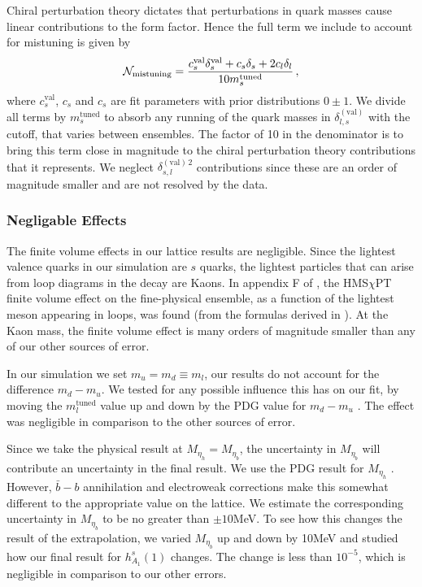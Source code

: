 Chiral perturbation theory dictates that perturbations in quark masses cause linear contributions to the form factor. Hence the full term we include to account for mistuning is given by
\begin{align}
  \mathcal{N}_{\text{mistuning}} = {c^{\text{val}}_s \delta^{\text{val}}_s + c_s \delta_s + 2 c_l \delta_l \over 10 m_s^{\text{tuned}}}\,,
  \label{eq:mistuning_BsDsstar}
\end{align}
where $c_s^{\text{val}}$, $c_s$ and $c_s$ are fit parameters with prior distributions $0\pm 1$. We divide all terms by $m_s^{\text{tuned}}$ to absorb any running of the quark masses in $\delta_{l,s}^{(\text{val})}$ with the cutoff, that varies between ensembles. The factor of 10 in the denominator is to bring this term close in magnitude to the chiral perturbation theory contributions that it represents. We neglect $\delta^{(\text{val})\,2}_{s,l}$ contributions since these are an order of magnitude smaller and are not resolved by the data.

\subsubsection{Negligable Effects}

The finite volume effects in our lattice results are negligible. Since the lightest valence quarks in our simulation are $s$ quarks, the lightest particles that can arise from loop diagrams in the decay are Kaons. In appendix F of \cite{Harrison:2017fmw}, the HMS$\chi$PT finite volume effect on the fine-physical ensemble, as a function of the lightest meson appearing in loops, was found (from the formulas derived in \cite{Laiho:2005ue}). At the Kaon mass, the finite volume effect is many orders of magnitude smaller than any of our other sources of error. 

In our simulation we set $m_u=m_d\equiv m_l$, our results do not account for the difference $m_d-m_u$. We tested for any possible influence this has on our fit, by moving the $m_l^{\text{tuned}}$ value up and down by the PDG value for $m_d-m_u$ \cite{PhysRevD.98.030001}. The effect was negligible in comparison to the other sources of error.

Since we take the physical result at $M_{\eta_h}=M_{\eta_b}$, the uncertainty in $M_{\eta_b}$ will contribute an uncertainty in the final result. We use the PDG result for $M_{\eta_h}$ \cite{PhysRevD.98.030001}. However, $\bar{b}-b$ annihilation and electroweak corrections make this somewhat different to the appropriate value on the lattice. We estimate the corresponding uncertainty in $M_{\eta_b}$ to be no greater than $\pm10$MeV. To see how this changes the result of the extrapolation, we varied $M_{\eta_b}$ up and down by 10MeV and studied how our final result for $h_{A_1}^s(1)$ changes. The change is less than $10^{-5}$, which is negligible in comparison to our other errors.

